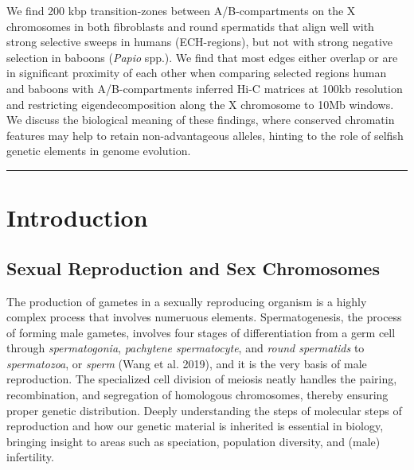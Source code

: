 \documentclass[
  11pt,
  a4paper,
]{scrbook}
\let\oldemph\emph
\renewcommand\emph[1]{\oldemph{\color{gray}#1}}
\renewcommand*\contentsname{Table of contents}
\newcommand\contentsname{Table of contents}
\begin{document}
{\begin{minipage}{.8\textwidth}
We find 200 kbp transition-zones between A/B-compartments on the X
chromosomes in both fibroblasts and round spermatids that align well
with strong selective sweeps in humans (ECH-regions), but not with
strong negative selection in baboons (\emph{Papio} spp.). We find that
most edges either overlap or are in significant proximity of each other
when comparing selected regions human and baboons with A/B-compartments
inferred Hi-C matrices at 100kb resolution and restricting
eigendecomposition along the X chromosome to 10Mb windows. We discuss
the biological meaning of these findings, where conserved chromatin
features may help to retain non-advantageous alleles, hinting to the
role of selfish genetic elements in genome
evolution. %
    \par %
    \vspace{2em} %
    \hspace*{\fill}\rule{0.5\textwidth}{0.4pt}\hspace*{\fill} %
\end{minipage}
\vspace*{\fill} %

}
\renewcommand*\contentsname{Table of contents}
{
\setcounter{tocdepth}{2}
\tableofcontents
}

\mainmatter
\chapter{Introduction}\label{introduction}

\section{Sexual Reproduction and Sex
Chromosomes}\label{sexual-reproduction-and-sex-chromosomes}

The production of gametes in a sexually reproducing organism is a highly
complex process that involves numeruous elements. Spermatogenesis, the
process of forming male gametes, involves four stages of differentiation
from a germ cell through \emph{spermatogonia}, \emph{pachytene
spermatocyte}, and \emph{round spermatids} to \emph{spermatozoa}, or
\emph{sperm} (Wang et al. 2019), and it is the very basis of male
reproduction. The specialized cell division of meiosis neatly handles
the pairing, recombination, and segregation of homologous chromosomes,
thereby ensuring proper genetic distribution. Deeply understanding the
steps of molecular steps of reproduction and how our genetic material is
inherited is essential in biology, bringing insight to areas such as
speciation, population diversity, and (male) infertility.
\end{document}
